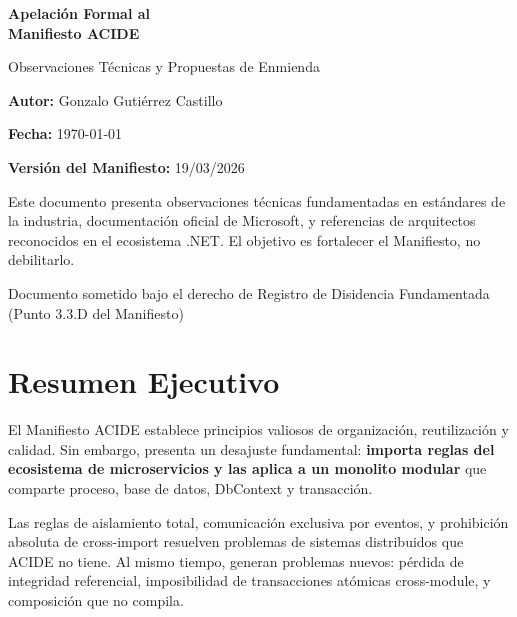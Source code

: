 \documentclass[12pt,a4paper]{article}
\begin{document}
\begin{titlepage}
\centering
\vspace*{3cm}
{\Huge\bfseries\color{accentblue} Apelaci\'on Formal al\\Manifiesto ACIDE\par}
\vspace{1cm}
{\Large Observaciones T\'ecnicas y Propuestas de Enmienda\par}
\vspace{2cm}
{\large\textbf{Autor:} Gonzalo Guti\'errez Castillo\par}
\vspace{0.5cm}
{\large\textbf{Fecha:} \today\par}
\vspace{0.5cm}
{\large\textbf{Versi\'on del Manifiesto:} 19/03/2026\par}
\vspace{2cm}
{\normalsize Este documento presenta observaciones t\'ecnicas fundamentadas en est\'andares de la industria, documentaci\'on oficial de Microsoft, y referencias de arquitectos reconocidos en el ecosistema .NET. El objetivo es fortalecer el Manifiesto, no debilitarlo.\par}
\vspace{2cm}
{\small\textcolor{codegray}{Documento sometido bajo el derecho de Registro de Disidencia Fundamentada (Punto 3.3.D del Manifiesto)}\par}
\end{titlepage}

\tableofcontents
\newpage

\section{Resumen Ejecutivo}

El Manifiesto ACIDE establece principios valiosos de organizaci\'on, reutilizaci\'on y calidad. Sin embargo, presenta un desajuste fundamental: \textbf{importa reglas del ecosistema de microservicios y las aplica a un monolito modular} que comparte proceso, base de datos, DbContext y transacci\'on.

Las reglas de aislamiento total, comunicaci\'on exclusiva por eventos, y prohibici\'on absoluta de cross-import resuelven problemas de sistemas distribuidos que ACIDE no tiene. Al mismo tiempo, generan problemas nuevos: p\'erdida de integridad referencial, imposibilidad de transacciones at\'omicas cross-module, y composici\'on que no compila.
\end{document}
